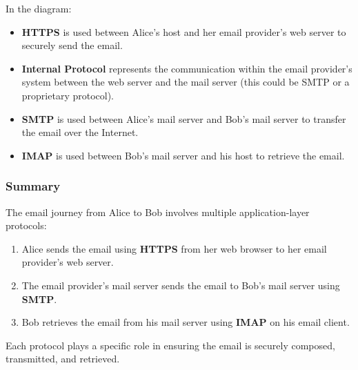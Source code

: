 \documentclass{cshwk}
\begin{document}
\noindent In the diagram:

\begin{itemize}
    \item \textbf{HTTPS} is used between Alice's host and her email provider's web server to securely send the email.
    \item \textbf{Internal Protocol} represents the communication within the email provider's system between the web server and the mail server (this could be SMTP or a proprietary protocol).
    \item \textbf{SMTP} is used between Alice's mail server and Bob's mail server to transfer the email over the Internet.
    \item \textbf{IMAP} is used between Bob's mail server and his host to retrieve the email.
\end{itemize}

\subsubsection*{Summary}

The email journey from Alice to Bob involves multiple application-layer protocols:

\begin{enumerate}
    \item Alice sends the email using \textbf{HTTPS} from her web browser to her email provider's web server.
    \item The email provider's mail server sends the email to Bob's mail server using \textbf{SMTP}.
    \item Bob retrieves the email from his mail server using \textbf{IMAP} on his email client.
\end{enumerate}

Each protocol plays a specific role in ensuring the email is securely composed, transmitted, and retrieved.
\end{document}
